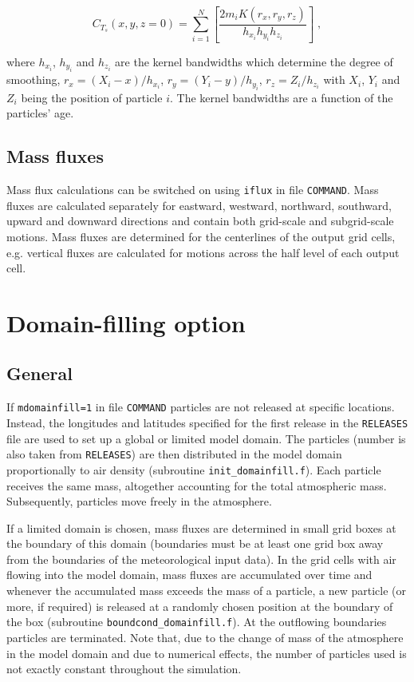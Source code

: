 \documentclass{egu}                  %
\begin{document}
\begin{equation}
C_{T_s}(x,y,z=0)=\sum_{i=1}^N \left[ \frac{2m_iK(r_x,r_y,r_z)}{h_{x_i}h_{y_i}h_{z_i}} \right]\;,
\end{equation}

where $h_{x_i}$, $h_{y_i}$ and $h_{z_i}$ are the kernel bandwidths which
determine the degree of smoothing, $r_x=(X_i-x)/h_{x_i}$,
$r_y=(Y_i-y)/h_{y_i}$, $r_z=Z_i/h_{z_i}$ with $X_i$, $Y_i$ and $Z_i$ being the
position of particle $i$.  The kernel bandwidths are a function of the
particles' age.

\subsection{Mass fluxes}

Mass flux calculations can be switched on using \verb|iflux| in file
\verb|COMMAND|.  Mass fluxes are calculated separately for eastward, westward,
northward, southward, upward and downward directions and contain both
grid-scale and subgrid-scale motions.  Mass fluxes are determined for the
centerlines of the output grid cells, e.g.  vertical fluxes are calculated for
motions across the half level of each output cell.

\section{Domain-filling option}

\subsection{General}

If \verb|mdomainfill=1| in file \verb|COMMAND| particles are not released at
specific locations.  Instead, the longitudes and latitudes specified for the
first release in the \verb|RELEASES| file are used to set up a global or
limited model domain.  The particles (number is also taken from
\verb|RELEASES|) are then distributed in the model domain proportionally to air
density (subroutine \verb|init_domainfill.f|).  Each particle receives the same
mass, altogether accounting for the total atmospheric mass.  Subsequently,
particles move freely in the atmosphere.

If a limited domain is chosen, mass fluxes are determined in small grid boxes
at the boundary of this domain (boundaries must be at least one grid box away
from the boundaries of the meteorological input data).  In the grid cells with
air flowing into the model domain, mass fluxes are accumulated over time and
whenever the accumulated mass exceeds the mass of a particle, a new particle
(or more, if required) is released at a randomly chosen position at the
boundary of the box (subroutine \verb|boundcond_domainfill.f|).  At the
outflowing boundaries particles are terminated.  Note that, due to the change
of mass of the atmosphere in the model domain and due to numerical effects, the
number of particles used is not exactly constant throughout the simulation.
\end{document}
